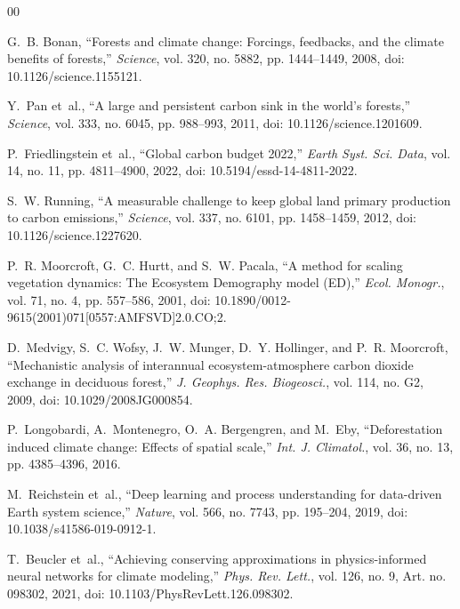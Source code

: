 \documentclass[conference]{IEEEtran}
\begin{document}
\begin{thebibliography}{00}
\setlength{\itemsep}{1.2pt plus 0.5pt minus 0.5pt}

G.~B. Bonan, ``Forests and climate change: Forcings, feedbacks, and the climate benefits of forests,'' \textit{Science}, vol. 320, no. 5882, pp. 1444--1449, 2008, doi: 10.1126/science.1155121.

Y.~Pan et~al., ``A large and persistent carbon sink in the world's forests,'' \textit{Science}, vol. 333, no. 6045, pp. 988--993, 2011, doi: 10.1126/science.1201609.

P.~Friedlingstein et~al., ``Global carbon budget 2022,'' \textit{Earth Syst. Sci. Data}, vol. 14, no. 11, pp. 4811--4900, 2022, doi: 10.5194/essd-14-4811-2022.

S.~W. Running, ``A measurable challenge to keep global land primary production to carbon emissions,'' \textit{Science}, vol. 337, no. 6101, pp. 1458--1459, 2012, doi: 10.1126/science.1227620.

P.~R. Moorcroft, G.~C. Hurtt, and S.~W. Pacala, ``A method for scaling vegetation dynamics: The Ecosystem Demography model (ED),'' \textit{Ecol. Monogr.}, vol. 71, no. 4, pp. 557--586, 2001, doi: 10.1890/0012-9615(2001)071[0557:AMFSVD]2.0.CO;2.

D.~Medvigy, S.~C. Wofsy, J.~W. Munger, D.~Y. Hollinger, and P.~R. Moorcroft, ``Mechanistic analysis of interannual ecosystem-atmosphere carbon dioxide exchange in deciduous forest,'' \textit{J. Geophys. Res. Biogeosci.}, vol. 114, no. G2, 2009, doi: 10.1029/2008JG000854.

P.~Longobardi, A.~Montenegro, O.~A. Bergengren, and M.~Eby, ``Deforestation induced climate change: Effects of spatial scale,'' \textit{Int. J. Climatol.}, vol. 36, no. 13, pp. 4385--4396, 2016.

M.~Reichstein et~al., ``Deep learning and process understanding for data-driven Earth system science,'' \textit{Nature}, vol. 566, no. 7743, pp. 195--204, 2019, doi: 10.1038/s41586-019-0912-1.

T.~Beucler et~al., ``Achieving conserving approximations in physics-informed neural networks for climate modeling,'' \textit{Phys. Rev. Lett.}, vol. 126, no. 9, Art. no. 098302, 2021, doi: 10.1103/PhysRevLett.126.098302.


\end{thebibliography}
\end{document}
